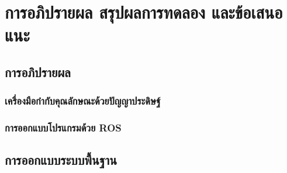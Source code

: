 
\chapter{การอภิปรายผล สรุปผลการทดลอง และข้อเสนอแนะ}

\section{การอภิปรายผล}
\subsection{เครื่องมือกำกับคุณลักษณะด้วยปัญญาประดิษฐ์}


\clearpage
\subsection{การออกแบบโปรแกรมด้วย ROS}
%

\clearpage
\section{การออกแบบระบบพื้นฐาน}


\clearpage

